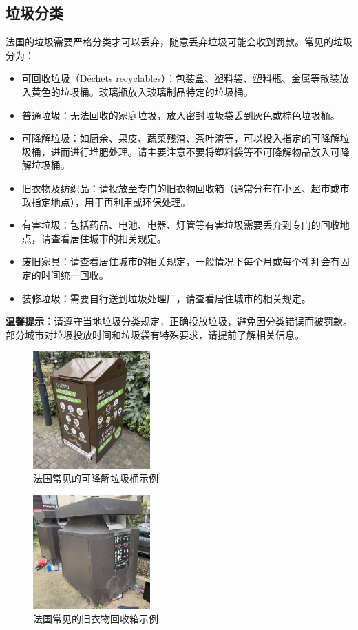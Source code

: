 \subsection{垃圾分类}

法国的垃圾需要严格分类才可以丢弃，随意丢弃垃圾可能会收到罚款。常见的垃圾分为：

\begin{itemize}
    \item 可回收垃圾（Déchets recyclables）：包装盒、塑料袋、塑料瓶、金属等散装放入黄色的垃圾桶。玻璃瓶放入玻璃制品特定的垃圾桶。
    \item 普通垃圾：无法回收的家庭垃圾，放入密封垃圾袋丢到灰色或棕色垃圾桶。
    \item 可降解垃圾：如厨余、果皮、蔬菜残渣、茶叶渣等，可以投入指定的可降解垃圾桶，进而进行堆肥处理。请主要注意不要将塑料袋等不可降解物品放入可降解垃圾桶。
    \item 旧衣物及纺织品：请投放至专门的旧衣物回收箱（通常分布在小区、超市或市政指定地点），用于再利用或环保处理。
    \item 有害垃圾：包括药品、电池、电器、灯管等有害垃圾需要丢弃到专门的回收地点，请查看居住城市的相关规定。
    \item 废旧家具：请查看居住城市的相关规定，一般情况下每个月或每个礼拜会有固定的时间统一回收。
    \item 装修垃圾：需要自行送到垃圾处理厂，请查看居住城市的相关规定。
\end{itemize}

\textbf{温馨提示：}请遵守当地垃圾分类规定，正确投放垃圾，避免因分类错误而被罚款。部分城市对垃圾投放时间和垃圾袋有特殊要求，请提前了解相关信息。

\begin{figure}[h]
    \centering
    \includegraphics[width=0.4\textwidth]{images/garbage_bin_biodegradable.jpg}
    \caption{法国常见的可降解垃圾桶示例}
\end{figure}

\begin{figure}[h]
    \centering
    \includegraphics[width=0.4\textwidth]{images/garbage_bin_clothes.jpg}
    \caption{法国常见的旧衣物回收箱示例}
\end{figure}
